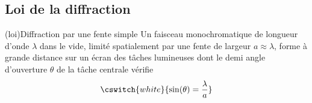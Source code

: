 \documentclass[../../main/main.tex]{subfiles}
\begin{document}
\subsection{Loi de la diffraction}

\begin{tcb}(loi){Diffraction par une fente simple}
	Un faisceau monochromatique de longueur d'onde $\lambda$ dans le vide,
	limité spatialement par une fente de largeur $a \approx \lambda$, forme à
	grande distance sur un écran des tâches lumineuses dont le demi angle
	d'ouverture $\theta$ de la tâche centrale vérifie
	\[
		\cswitch{white}{
			\sin(\theta) = \frac{\lambda}{a}
		}
	\]
\end{tcb}


\end{document}
